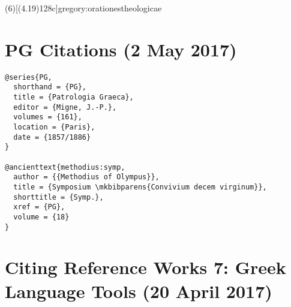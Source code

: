 \documentclass[a4paper]{article}
\begin{document}
\examplecite(6)[(4.19)128c]{gregory:orationestheologicae}
\exampleabbreviations
{}

\section{PG Citations (2 May 2017)}

\begin{verbatim}
@series{PG,
  shorthand = {PG},
  title = {Patrologia Graeca},
  editor = {Migne, J.-P.},
  volumes = {161},
  location = {Paris},
  date = {1857/1886}
}

@ancienttext{methodius:symp,
  author = {{Methodius of Olympus}},
  title = {Symposium \mkbibparens{Convivium decem virginum}},
  shorttitle = {Symp.},
  xref = {PG},
  volume = {18}
}
\end{verbatim}

\exampleancientsources
\examplesecondarysources
{}

\section{Citing Reference Works 7: Greek Language Tools (20 April 2017)}
\end{document}
